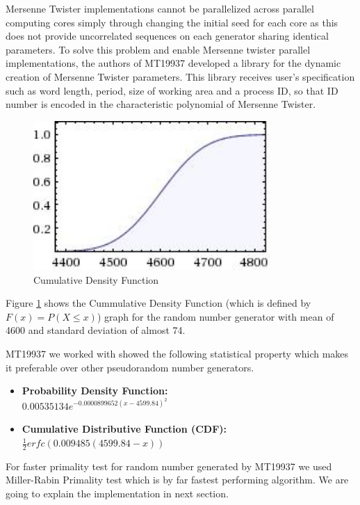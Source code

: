 \documentclass[12pt,journal,compsoc]{IEEEtran}
\begin{document}
Mersenne Twister implementations cannot be parallelized across parallel computing cores simply through changing the initial seed for each core as this does not provide uncorrelated sequences on each generator sharing identical parameters. To solve this problem and enable Mersenne twister parallel implementations, the authors of MT19937\cite{MT19937} developed a library for the dynamic creation of Mersenne Twister parameters. This library receives user's specification such as word length, period, size of working area and a process ID, so that ID number is encoded in the characteristic polynomial of Mersenne Twister.
\begin{figure}[ht!]
\centering
\includegraphics[width=90mm]{images/cdf_mersenne.jpeg}
\caption{Cumulative Density Function}
\label{fig:cdf_mersenne}
\end{figure}


Figure \ref{fig:cdf_mersenne} shows the Cummulative Density Function (which is defined by $F(x) = P(X\leq x)$) graph for the random number generator with mean of 4600 and standard deviation of almost 74. 


MT19937 we worked with showed the following statistical property which makes it preferable over other pseudorandom number generators.\cite{wolfram_mt}
\begin{itemize}
	\item {\bf Probability Density Function: }\\
		$0.00535134e^{-0.0000899652 (x-4599.84)^{2}}$
	\item {\bf Cumulative Distributive Function (CDF): }\\
		$\frac{1}{2}erfc(0.009485(4599.84-x))$
\end{itemize}

For faster primality test for random number generated by MT19937 we used Miller-Rabin Primality test which is by far fastest performing algorithm. We are going to explain the implementation in next section.
\end{document}
